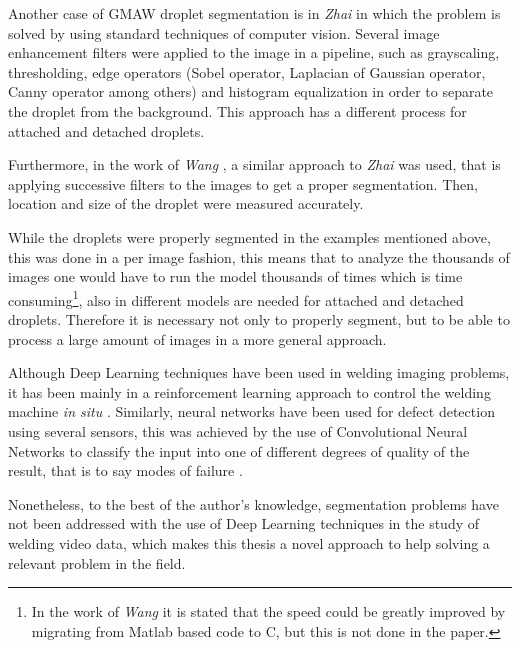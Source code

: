 Another case of GMAW droplet segmentation is in \textit{Zhai} \cite{Zhai} in which the problem is solved by using standard techniques of computer vision. Several image enhancement filters were applied to the image in a pipeline, such as grayscaling, thresholding, edge operators (Sobel operator, Laplacian of Gaussian operator, Canny operator among others) and histogram equalization in order to separate the droplet from the background. This approach has a different process for attached and detached droplets. 

Furthermore, in the work of \textit{Wang} \cite{wang}, a similar approach to \textit{Zhai} \cite{Zhai} was used, that is applying successive filters to the images to get a proper segmentation. Then, location and size of the droplet were measured accurately.

While the droplets were properly segmented in the examples mentioned above, this was done in a per image fashion, this means that to analyze the thousands of images one would have to run the model thousands of times which is time consuming\footnote{In the work of \textit{Wang} \cite{wang} it is stated that the speed could be greatly improved by migrating from Matlab based code to C, but this is not done in the paper.}, also in \cite{Zhai} different models are needed for attached and detached droplets. Therefore it is necessary not only to properly segment, but to be able to process a large amount of images in a more general approach.

Although Deep Learning techniques have been used in welding imaging problems, it has been mainly in a reinforcement learning approach to control the welding machine \textit{in situ} \cite{Gunther}. Similarly, neural networks have been used for defect detection using several sensors, this was achieved by the use of Convolutional Neural Networks to classify the input into one of different degrees of quality of the result, that is to say modes of failure \cite{Zhang}.

Nonetheless, to the best of the author's knowledge, segmentation problems have not been addressed with the use of Deep Learning techniques in the study of welding video data, which makes this thesis a novel approach to help solving a relevant problem in the field.